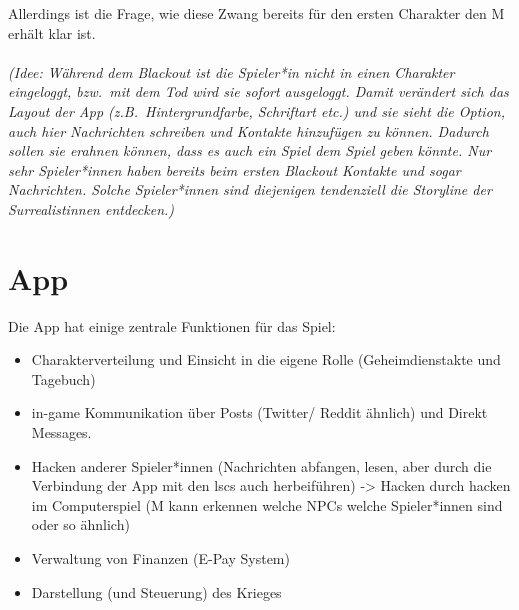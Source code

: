 Allerdings ist die Frage, wie diese Zwang bereits für den ersten Charakter den M
erhält klar ist.\\\\
%
\emph{(Idee: Während dem Blackout ist die Spieler*in nicht in einen Charakter
eingeloggt, bzw.~mit dem Tod wird sie sofort ausgeloggt. Damit verändert sich
das Layout der App (z.B.~Hintergrundfarbe, Schriftart etc.) und sie sieht 
die Option, auch hier Nachrichten schreiben und Kontakte hinzufügen zu können. 
Dadurch sollen sie erahnen können, dass es auch ein Spiel  dem Spiel
geben könnte. Nur sehr Spieler*innen haben bereits beim ersten Blackout Kontakte
und sogar Nachrichten. Solche Spieler*innen sind diejenigen tendenziell die
Storyline der Surrealistinnen entdecken.)}

\section{App} 
Die App hat einige zentrale Funktionen für das Spiel:
\begin{itemize}
  \item Charakterverteilung und Einsicht in die eigene Rolle (Geheimdienstakte
    und Tagebuch)
  \item in-game Kommunikation über Posts (Twitter/ Reddit ähnlich) und Direkt
    Messages. 
  \item Hacken anderer Spieler*innen (Nachrichten abfangen, lesen, aber durch
    die Verbindung der App mit den \ac{lsc}s auch 
    herbeiführen) -> Hacken durch hacken im Computerspiel (M kann erkennen welche
    NPCs welche Spieler*innen sind oder so ähnlich)
  \item Verwaltung von Finanzen (E-Pay System)
  \item Darstellung (und Steuerung) des Krieges
\end{itemize}


